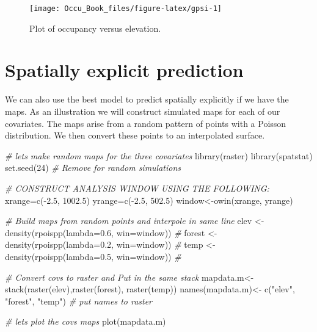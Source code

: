 \documentclass[
]{book}
\newenvironment{Shaded}{\begin{snugshade}}{\end{snugshade}}
\newcommand{\AttributeTok}[1]{\textcolor[rgb]{0.77,0.63,0.00}{#1}}
\newcommand{\CommentTok}[1]{\textcolor[rgb]{0.56,0.35,0.01}{\textit{#1}}}
\newcommand{\DecValTok}[1]{\textcolor[rgb]{0.00,0.00,0.81}{#1}}
\newcommand{\FloatTok}[1]{\textcolor[rgb]{0.00,0.00,0.81}{#1}}
\newcommand{\FunctionTok}[1]{\textcolor[rgb]{0.00,0.00,0.00}{#1}}
\newcommand{\NormalTok}[1]{#1}
\newcommand{\OtherTok}[1]{\textcolor[rgb]{0.56,0.35,0.01}{#1}}
\newcommand{\SpecialCharTok}[1]{\textcolor[rgb]{0.00,0.00,0.00}{#1}}
\newcommand{\StringTok}[1]{\textcolor[rgb]{0.31,0.60,0.02}{#1}}
\begin{document}
\begin{figure}
\texttt{[image: Occu\_Book\_files/figure-latex/gpsi-1]} \caption[fig.]{Plot of occupancy versus elevation.}\label{fig:gpsi}
\end{figure}

\hypertarget{spatially-explicit-prediction}{%
\section{Spatially explicit prediction}\label{spatially-explicit-prediction}}

We can also use the best model to predict spatially explicitly if we have the maps. As an illustration we will construct simulated maps for each of our covariates. The maps arise from a random pattern of points with a Poisson distribution. We then convert these points to an interpolated surface.

\begin{Shaded}
\begin{Highlighting}[]
\CommentTok{\# lets make random maps for the three covariates}
\FunctionTok{library}\NormalTok{(raster)}
\FunctionTok{library}\NormalTok{(spatstat)}
\FunctionTok{set.seed}\NormalTok{(}\DecValTok{24}\NormalTok{) }\CommentTok{\# Remove for random simulations}

\CommentTok{\# CONSTRUCT ANALYSIS WINDOW USING THE FOLLOWING:}
\NormalTok{xrange}\OtherTok{=}\FunctionTok{c}\NormalTok{(}\SpecialCharTok{{-}}\FloatTok{2.5}\NormalTok{, }\FloatTok{1002.5}\NormalTok{)}
\NormalTok{yrange}\OtherTok{=}\FunctionTok{c}\NormalTok{(}\SpecialCharTok{{-}}\FloatTok{2.5}\NormalTok{, }\FloatTok{502.5}\NormalTok{)}
\NormalTok{window}\OtherTok{\textless{}{-}}\FunctionTok{owin}\NormalTok{(xrange, yrange)}

\CommentTok{\# Build maps from random points and interpole in same line}
\NormalTok{elev   }\OtherTok{\textless{}{-}} \FunctionTok{density}\NormalTok{(}\FunctionTok{rpoispp}\NormalTok{(}\AttributeTok{lambda=}\FloatTok{0.6}\NormalTok{, }\AttributeTok{win=}\NormalTok{window)) }\CommentTok{\# }
\NormalTok{forest }\OtherTok{\textless{}{-}} \FunctionTok{density}\NormalTok{(}\FunctionTok{rpoispp}\NormalTok{(}\AttributeTok{lambda=}\FloatTok{0.2}\NormalTok{, }\AttributeTok{win=}\NormalTok{window)) }\CommentTok{\# }
\NormalTok{temp   }\OtherTok{\textless{}{-}} \FunctionTok{density}\NormalTok{(}\FunctionTok{rpoispp}\NormalTok{(}\AttributeTok{lambda=}\FloatTok{0.5}\NormalTok{, }\AttributeTok{win=}\NormalTok{window)) }\CommentTok{\# }

\CommentTok{\# Convert covs to raster and Put in the same stack }
\NormalTok{mapdata.m}\OtherTok{\textless{}{-}}\FunctionTok{stack}\NormalTok{(}\FunctionTok{raster}\NormalTok{(elev),}\FunctionTok{raster}\NormalTok{(forest), }\FunctionTok{raster}\NormalTok{(temp)) }
\FunctionTok{names}\NormalTok{(mapdata.m)}\OtherTok{\textless{}{-}} \FunctionTok{c}\NormalTok{(}\StringTok{"elev"}\NormalTok{, }\StringTok{"forest"}\NormalTok{, }\StringTok{"temp"}\NormalTok{) }\CommentTok{\# put names to raster}

\CommentTok{\# lets plot the covs maps}
\FunctionTok{plot}\NormalTok{(mapdata.m)}
\end{Highlighting}
\end{Shaded}
\end{document}
